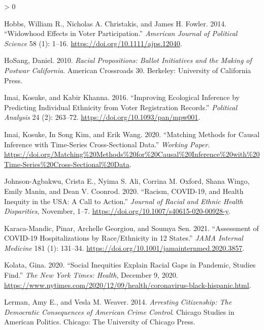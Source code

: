 \documentclass[
  12pt,
]{article}
\newlength{\cslhangindent}
\newenvironment{CSLReferences}[2] %
 {%
  \setlength{\parindent}{0pt}
  \ifodd #1 \everypar{\setlength{\hangindent}{\cslhangindent}}\ignorespaces\fi
  \ifnum #2 > 0
  \setlength{\parskip}{#2\baselineskip}
  \fi
 }%
 {}
\begin{document}
\begin{CSLReferences}{1}{0}
\leavevmode\hypertarget{ref-Hobbs2014}{}%
Hobbs, William R., Nicholas A. Christakis, and James H. Fowler. 2014. {``Widowhood {Effects} in {Voter Participation}.''} \emph{American Journal of Political Science} 58 (1): 1--16. \url{https://doi.org/10.1111/ajps.12040}.

\leavevmode\hypertarget{ref-HoSang2010}{}%
HoSang, Daniel. 2010. \emph{Racial Propositions: Ballot {Initiatives} and the Making of Postwar {California}}. American Crossroads 30. {Berkeley}: {University of California Press}.

\leavevmode\hypertarget{ref-Imai2016}{}%
Imai, Kosuke, and Kabir Khanna. 2016. {``Improving {Ecological Inference} by {Predicting Individual Ethnicity} from {Voter Registration Records}.''} \emph{Political Analysis} 24 (2): 263--72. \url{https://doi.org/10.1093/pan/mpw001}.

\leavevmode\hypertarget{ref-Imai2020}{}%
Imai, Kosuke, In Song Kim, and Erik Wang. 2020. {``Matching {Methods} for {Causal Inference} with {Time}-{Series Cross}-{Sectional Data}.''} \emph{Working Paper}. \url{https://doi.org/Matching\%20Methods\%20for\%20Causal\%20Inference\%20with\%20Time-Series\%20Cross-Sectional\%20Data}.

\leavevmode\hypertarget{ref-Johnson-Agbakwu2020}{}%
Johnson-Agbakwu, Crista E., Nyima S. Ali, Corrina M. Oxford, Shana Wingo, Emily Manin, and Dean V. Coonrod. 2020. {``Racism, {COVID}-19, and {Health Inequity} in the {USA}: A {Call} to {Action}.''} \emph{Journal of Racial and Ethnic Health Disparities}, November, 1--7. \url{https://doi.org/10.1007/s40615-020-00928-y}.

\leavevmode\hypertarget{ref-Karaca-Mandic2021}{}%
Karaca-Mandic, Pinar, Archelle Georgiou, and Soumya Sen. 2021. {``Assessment of {COVID}-19 {Hospitalizations} by {Race}/{Ethnicity} in 12 {States}.''} \emph{JAMA Internal Medicine} 181 (1): 131--34. \url{https://doi.org/10.1001/jamainternmed.2020.3857}.

\leavevmode\hypertarget{ref-Kolata2020}{}%
Kolata, Gina. 2020. {``Social {Inequities Explain Racial Gaps} in {Pandemic}, {Studies Find}.''} \emph{The New York Times: Health}, December 9, 2020. \url{https://www.nytimes.com/2020/12/09/health/coronavirus-black-hispanic.html}.

\leavevmode\hypertarget{ref-Lerman2014}{}%
Lerman, Amy E., and Vesla M. Weaver. 2014. \emph{Arresting Citizenship: The Democratic Consequences of {American} Crime Control}. Chicago Studies in {American} Politics. {Chicago}: {The University of Chicago Press}.


\end{CSLReferences}
\end{document}
